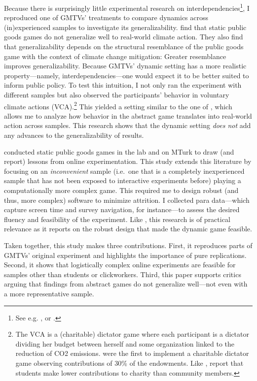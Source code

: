 \documentclass[
  authoryear,
  review,
  3p,
  onecolumn]{elsarticle}
\begin{document}
Because there is surprisingly little experimental research on
interdependencies\footnote{See e.g. \citet{BattagliniEtAl2016},
  \citet{Rockenbach2017} or \citet{Moser2019}.}, I reproduced one of
GMTVs' treatments to compare dynamics across (in)experienced samples to
investigate its generalizability. \citet{GKLS2020} find that static
public goods games do not generalize well to real-world climate action.
They also find that generalizability depends on the structural
resemblance of the public goods game with the context of climate change
mitigation: Greater resemblance improves generalizability. Because
GMTVs' dynamic setting has a more realistic property---namely,
interdependencies---one would expect it to be better suited to inform
public policy. To test this intuition, I not only ran the experiment
with different samples but also observed the participants' behavior in
voluntary climate actions (VCA).\footnote{The VCA is a (charitable)
  dictator game where each participant is a dictator dividing her budget
  between herself and some organization linked to the reduction of CO2
  emissions. \citet{EckelGrossman1996} were the first to implement a
  charitable dictator game observing contributions of 30\% of the
  endowments. Like \citet{GKLS2020}, \citet{CarpenterEtAl2008} report
  that students make lower contributions to charity than community
  members.} This yielded a setting similar to the one of
\citet{GKLS2020}, which allows me to analyze how behavior in the
abstract game translates into real-world action across samples. This
research shows that the dynamic setting \emph{does not} add any advances
to the generalizability of results.

\citet{AGM2018} conducted static public goods games in the lab and on
MTurk to draw (and report) lessons from online experimentation. This
study extends this literature \citep[see,
e.g.,][]{SnowbergYariv_2021, GuptaRigottiWilson_2021, GoodmanPaolacci2017, AmirEtAl2012}
by focusing on an \emph{inconvenient} sample (i.e.~one that is a
completely inexperienced sample that has not been exposed to interactive
experiments before) playing a computationally more complex game. This
required me to design robust (and thus, more complex) software to
minimize attrition. I collected para data---which capture screen time
and survey navigation, for instance---to assess the desired fluency and
feasibility of the experiment. Like \citet{AGM2018}, this research is of
practical relevance as it reports on the robust design that made the
dynamic game feasible.

Taken together, this study makes three contributions. First, it
reproduces parts of GMTVs' original experiment and highlights the
importance of pure replications. Second, it shows that logistically
complex online experiments are feasible for samples other than students
or clickworkers. Third, this paper supports critics arguing that
findings from abstract games do not generalize well---not even with a
more representative sample.
\end{document}
